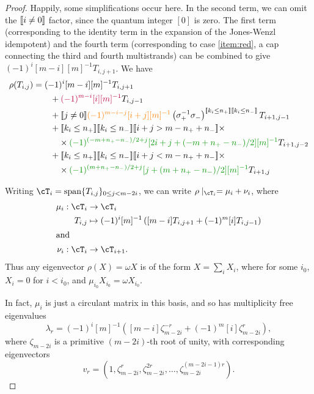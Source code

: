 \documentclass[12pt]{article}
\begin{document}
\begin{proof}
Happily, some simplifications occur here. In the second term, we can omit the $[\![ i\neq0 ]\!]$ factor, since the quantum integer $[0]$ is zero. The first term (corresponding to the identity term in the expansion of the Jones-Wenzl idempotent) and the fourth term (corresponding to case \eqref{item:red}, a cap connecting the third and fourth multistrands) can be combined to give $(-1)^i [m-i][m]^{-1} T_{i,j+1}$. We have
\begin{align*}
\rho(T_{i,j}) & =
(-1)^i[m-i][m]^{-1} T_{i, j + 1} \\
& \qquad +
\textcolor{purple}{(-1)^{m-i} [i][m]^{-1}} T_{i,j-1} \\
& \qquad +
\truth{j \neq 0}\textcolor{orange}{(-1)^{m-i-j} [i+j][m]^{-1}} \left(\sigma_+^{-1} \sigma_-\right)^{\truth{k_i \leq n_+} \truth{k_i \leq n_-}} T_{i+1, j-1} \\
& \qquad +
\truth{k_i \leq n_+} \truth{k_i \leq n_-}
\truth{i+j > m - n_+ + n_-} \times \\
& \qquad \quad \times \textcolor{DarkGreen}{(-1)^{(-m + n_+ - n_-)/2 + j} [2i + j + (-m + n_+ - n_-)/2][m]^{-1}} T_{i+1,j-2} \\
& \qquad +
\truth{k_i \leq n_+} \truth{k_i \leq n_-}
\truth{i+j < m - n_+ + n_-} \times \\
& \qquad \quad \times \textcolor{DarkGreen}{(-1)^{(m + n_+ - n_-)/2 + j} [j+ (m + n_+ - n_-)/2 ][m]^{-1}} T_{i+1,j}
\end{align*}


Writing $\cT_i = \Span \{ T_{i,j} \}_{0 \leq j < m- 2i}$, we can write $\rho \mid_{\cT_i} = \mu_i + \nu_i$, where
\begin{align*}
\mu_i :  \cT_i & \to \cT_i \\
  T_{i,j} & \mapsto (-1)^i [m]^{-1} \left( [m-i] T_{i,j+1} + (-1)^{m}[i] T_{i,j-1}\right) \\
\intertext{and}
\nu_i : \cT_i & \to \cT_{i+1}.
\end{align*}
Thus any eigenvector $\rho(X) = \omega X$ is of the form $X = \sum_i X_i$, where for some $i_0$, $X_i = 0$ for $i < i_0$, and $\mu_{i_0} X_{i_0} = \omega X_{i_0}$.

In fact, $\mu_i$ is just a circulant matrix in this basis, and so has multiplicity free eigenvalues
$$\lambda_r = (-1)^i[m]^{-1} \left([m-i] \zeta_{m-2i}^{-r} + (-1)^{m}[i] \zeta_{m-2i}^r\right),$$
where $\zeta_{m-2i}$ is a primitive $(m-2i)$-th root of unity, with corresponding eigenvectors
$$v_r = \left(1, \zeta_{m-2i}^r , \zeta_{m-2i}^{2r} , \ldots, \zeta_{m-2i}^{(m-2i-1)r} \right).$$


\end{proof}
\end{document}
